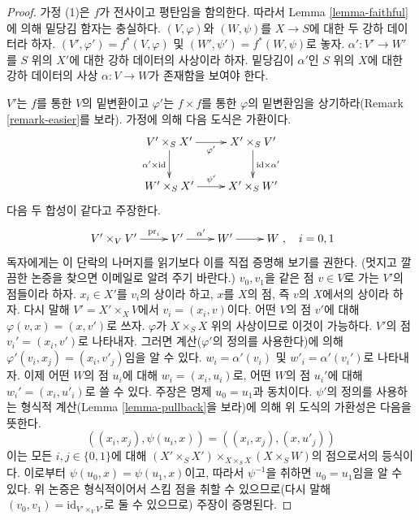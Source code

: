 \begin{proof}
가정 (1)은 $f$가 전사이고 평탄임을 함의한다. 따라서 Lemma
\ref{lemma-faithful}에 의해 밑당김 함자는 충실하다.
$(V, \varphi)$와 $(W, \psi)$를 $X \to S$에 대한 두 강하 데이터라
하자. $(V', \varphi') = f^*(V, \varphi)$ 및
$(W', \psi') = f^*(W, \psi)$로 놓자. $\alpha' : V' \to W'$를
$S$ 위의 $X'$에 대한 강하 데이터의 사상이라 하자. 밑당김이
$\alpha'$인 $S$ 위의 $X$에 대한 강하 데이터의 사상
$\alpha : V \to W$가 존재함을 보여야 한다.

\medskip\noindent
$V'$는 $f$를 통한 $V$의 밑변환이고 $\varphi'$는 $f \times f$를
통한 $\varphi$의 밑변환임을 상기하라(Remark
\ref{remark-easier}를 보라). 가정에 의해 다음 도식은 가환이다.
$$
\xymatrix{
V' \times_S X' \ar[r]_{\varphi'} \ar[d]_{\alpha' \times \text{id}} &
X' \times_S V' \ar[d]^{\text{id} \times \alpha'} \\
W' \times_S X' \ar[r]^{\psi'} &
X' \times_S W'
}
$$
다음 두 합성이 같다고 주장한다.
$$
\xymatrix{
V' \times_V V' \ar[r]^-{\text{pr}_i} &
V' \ar[r]^{\alpha'} &
W' \ar[r] &
W
}
, \quad i = 0, 1
$$
독자에게는 이 단락의 나머지를 읽기보다 이를 직접 증명해 보기를
권한다. (멋지고 깔끔한 논증을 찾으면 이메일로 알려 주기 바란다.)
$v_0, v_1$을 같은 점 $v \in V$로 가는 $V'$의 점들이라 하자.
$x_i \in X'$를 $v_i$의 상이라 하고, $x$를 $X$의 점, 즉 $v$의
$X$에서의 상이라
하자. 다시 말해 $V' = X' \times_X V$에서 $v_i = (x_i, v)$이다.
어떤 $V$의 점 $v'$에 대해 $\varphi(v, x) = (x, v')$로 쓰자.
$\varphi$가 $X \times_S X$ 위의 사상이므로 이것이 가능하다.
$V'$의 점 $v_i' = (x_i, v')$로 나타내자. 그러면 계산($\varphi'$의
정의를 사용한다)에 의해 $\varphi'(v_i, x_j) = (x_i, v'_j)$임을
알 수 있다. $w_i = \alpha'(v_i)$ 및 $w'_i = \alpha'(v_i')$로
나타내자. 이제 어떤 $W$의 점 $u_i$에 대해 $w_i = (x_i, u_i)$로,
어떤 $W$의 점 $u_i'$에 대해 $w_i' = (x_i, u'_i)$로 쓸 수 있다.
주장은 명제 $u_0 = u_1$과 동치이다. $\psi'$의 정의를 사용하는
형식적 계산(Lemma \ref{lemma-pullback}을 보라)에 의해 위 도식의
가환성은 다음을 뜻한다.
$$
((x_i, x_j), \psi(u_i, x)) = ((x_i, x_j), (x, u'_j))
$$
이는 모든 $i, j \in \{0, 1\}$에 대해
$(X' \times_S X') \times_{X \times_S X} (X \times_S W)$의 점으로서의
등식이다. 이로부터 $\psi(u_0, x) = \psi(u_1, x)$이고, 따라서
$\psi^{-1}$을 취하면 $u_0 = u_1$임을 알 수 있다. 위 논증은
형식적이어서 스킴 점을 취할 수 있으므로(다시 말해
$(v_0, v_1) = \text{id}_{V' \times_V V'}$로 둘 수 있으므로) 주장이
증명된다.


\end{proof}
